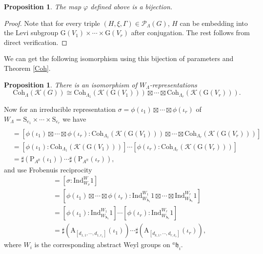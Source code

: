 \documentclass[12pt, a4paper]{amsart}
\numberwithin{equation}{section}
\newtheorem{prop}[thm]{Proposition}
\newcommand{\blam}{{\boldsymbol{\lambda}}}
\newcommand{\BR}{{\mathbb {R}}}
\newcommand{\CK}{{\mathcal {K}}}
\newcommand{\fh}{\mathfrak{h}}
\newcommand{\G}{{\mathrm{G}}}
\newcommand{\A}{{\mathrm{A}}}
\newcommand{\Ind}{{\mathrm{Ind}}}
\begin{document}
\begin{prop}\label{varphi bij}
    The map $\varphi$ defined above is a bijection.
\end{prop}

\begin{proof}
    Note that for every triple $(H,\xi,\Gamma) \in \mathscr{P}_{\Lambda}(G)$, $H$ can be embedding into the Levi subgroup $\G(V_1) \times \cdots \times \G(V_r)$ after conjugation. The rest follows from direct verification.
\end{proof}

We can get the following isomorphism using this bijection of parameters and Theorem \ref{Coh}.

\begin{prop}\label{Coh cong}
    There is an isomorphism of $W_{\Lambda}$-representations
    \begin{equation}
        \mathrm{Coh}_{\Lambda}(\CK(G)) \cong \mathrm{Coh}_{\Lambda_1}(\CK(\G(V_1))) \boxtimes \cdots \boxtimes \mathrm{Coh}_{\Lambda_r}(\CK(\G(V_r))).
    \end{equation}
\end{prop}

Now for an irreducible representation $\sigma = \phi(\iota_1) \boxtimes \cdots \boxtimes \phi(\iota_r)$ of $W_{\Lambda} = \mathrm{S}_{e_1} \times \cdots \times \mathrm{S}_{e_r}$ we have 
\begin{align*}
[\sigma:&\mathrm{Coh}_{\Lambda}(\CK(G))] \\
 & = [\phi(\iota_1) \boxtimes \cdots \boxtimes \phi(\iota_r) : \mathrm{Coh}_{\Lambda_1}(\CK(\G(V_1))) \boxtimes \cdots \boxtimes \mathrm{Coh}_{\Lambda_r}(\CK(\G(V_r)))]\\
 & = [\phi(\iota_1): \mathrm{Coh}_{\Lambda_1}(\CK(\G(V_1)))]\cdots [\phi(\iota_r):\mathrm{Coh}_{\Lambda_r}(\CK(\G(V_r)))]\\
 & = \sharp(\mathrm{P}_{A^\BR}(\iota_1)) \cdots \sharp(\mathrm{P}_{A^\BR}(\iota_r)),
\end{align*}
and use Frobenuis reciprocity
\begin{align*}
    [1_{W_\nu} : \sigma ] & = [\sigma: \Ind_{W_{\nu}}^{W}1]\\
    & = [\phi(\iota_1) \boxtimes \cdots \boxtimes \phi(\iota_r): \Ind_{W_{\blam_1}}^{W_1}1 \boxtimes \cdots \boxtimes \Ind_{W_{\blam_r}}^{W_r}1 ]\\
    & = [\phi(\iota_1):\Ind_{W_{\blam_1}}^{W_1}1] \cdots [\phi(\iota_r):\Ind_{W_{\blam_r}}^{W_r}1]\\
    & = \sharp(\A_{[d_{1,1},\cdots,d_{1,r_1}]}(\iota_1))\cdots \sharp(\A_{[d_{k,1},\cdots,d_{r,k_r}]}(\iota_r)),
\end{align*}
where $W_i$ is the corresponding abstract Weyl groups on $^{a}\fh_i$.
\end{document}
